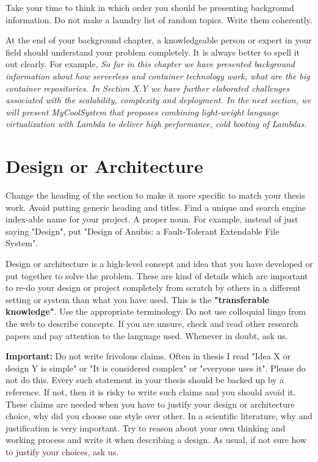 \documentclass{article}
\begin{document}
Take your time to think in which order you should be presenting background information. Do not make a laundry list of random topics. Write them coherently. 

At the end of your background chapter, a knowledgeable person or expert in your field should understand your problem completely. It is always better to spell it out clearly. For example, \textit{So far in this chapter we have presented background information about how serverless and container technology work, what are the big container repositories. In Section X.Y we have further elaborated challenges associated with the scalability, complexity and deployment. In the next section, we will present MyCoolSystem that proposes combining light-weight language virtualization with Lambda to deliver high performance, cold booting of Lambdas.}

\newpage 
\section{Design or Architecture}
Change the heading of the section to make it more specific to match your thesis work. Avoid putting generic heading and titles. Find a unique and search engine index-able name for your project. A proper noun. For example, instead of just saying "Design", put "Design of Anubis: a Fault-Tolerant  Extendable File System". 

Design or architecture is a high-level concept and idea that you have developed or put together to solve the problem. These are kind of details which are important to re-do your design or project completely from scratch by others in a different setting or system than what you have used. This is the \textbf{"transferable knowledge"}. Use the appropriate terminology. Do not use colloquial lingo from the web to describe concepts. If you are unsure, check and read other research papers and pay attention to the language used. Whenever in doubt, ask us. 


$ $\\

\noindent\textbf{Important:} Do not write frivolous claims. Often in thesis I read "Idea X or design Y is simple" or "It is considered complex" or "everyone uses it". Please do not do this. Every such statement in your thesis should be backed up by a reference. If not, then it is risky to write such claims and you should avoid it. These claims are needed when you have to justify your design or architecture choice, why did you choose one style over other. In a scientific literature, why and justification is very important. Try to reason about your own thinking and working process and write it when describing a design. As usual, if not sure how to justify your choices, ask us. 
\end{document}
